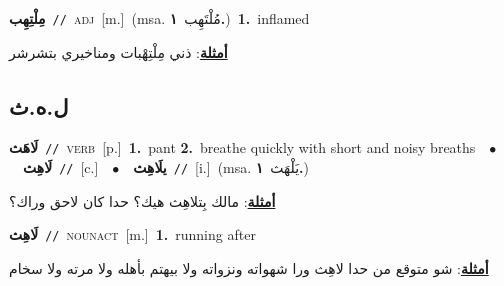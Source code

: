 \documentclass[10pt,a4paper,twoside]{article} %
\begin{document}
\begin{multicols}{2}
{\setlength\topsep{0pt}\textbf{\foreignlanguage{arabic}{مِلْتِهِب}}\ {\color{gray}\texttt{//}\color{black}}\ \textsc{adj}\ [m.]\ \color{gray}(msa. \foreignlanguage{arabic}{مُلْتَهِب}~\foreignlanguage{arabic}{\textbf{١.}})\color{black}\ \textbf{1.}~inflamed\  \begin{flushright}\color{gray}\foreignlanguage{arabic}{\textbf{\underline{\foreignlanguage{arabic}{أمثلة}}}: ذني مِلْتِهْبات ومناخيري بتشرشر}\end{flushright}\color{black}} \vspace{2mm}

\vspace{-3mm}
\subsection*{\color{blue}\foreignlanguage{arabic}{ل.ه.ث}\color{blue}{}} 

{\setlength\topsep{0pt}\textbf{\foreignlanguage{arabic}{لَاهَث}}\ {\color{gray}\texttt{//}\color{black}}\ \textsc{verb}\ [p.]\ \textbf{1.}~pant  \textbf{2.}~breathe quickly with short and noisy breaths\ \ $\bullet$\ \ \setlength\topsep{0pt}\textbf{\foreignlanguage{arabic}{لَاهِث}}\ {\color{gray}\texttt{//}\color{black}}\ [c.]\ \ $\bullet$\ \ \setlength\topsep{0pt}\textbf{\foreignlanguage{arabic}{يلَاهِث}}\ {\color{gray}\texttt{//}\color{black}}\ [i.]\ \color{gray}(msa. \foreignlanguage{arabic}{يَلْهَث}~\foreignlanguage{arabic}{\textbf{١.}})\color{black}\  \begin{flushright}\color{gray}\foreignlanguage{arabic}{\textbf{\underline{\foreignlanguage{arabic}{أمثلة}}}: مالك بِتلاهِث هيك؟ حدا كان لاحق وراك؟}\end{flushright}\color{black}} \vspace{2mm}

{\setlength\topsep{0pt}\textbf{\foreignlanguage{arabic}{لَاهِث}}\ {\color{gray}\texttt{//}\color{black}}\ \textsc{noun\textunderscore act}\ [m.]\ \textbf{1.}~running after\  \begin{flushright}\color{gray}\foreignlanguage{arabic}{\textbf{\underline{\foreignlanguage{arabic}{أمثلة}}}: شو متوقع من حدا لاهِث ورا شهواته ونزواته ولا بيهتم بأهله ولا مرته ولا سخام}\end{flushright}\color{black}} \vspace{2mm}


\end{multicols}
\end{document}
